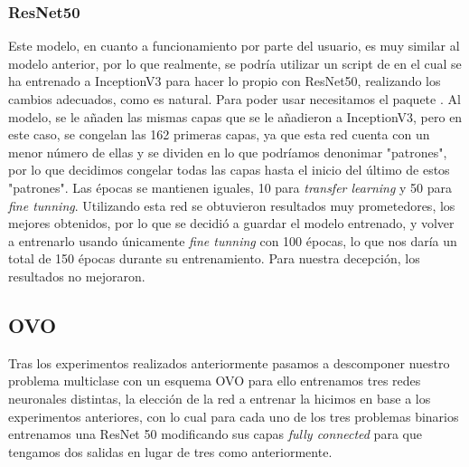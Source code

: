 \subsubsection{ResNet50}

Este modelo, en cuanto a funcionamiento por parte del usuario, es muy similar al modelo anterior, por lo que realmente, se podría utilizar un script de en el cual se ha entrenado a InceptionV3 para hacer lo propio con ResNet50, realizando los cambios adecuados, como es natural. Para poder usar  necesitamos el paquete . Al modelo, se le añaden las mismas capas que se le añadieron a InceptionV3, pero en este caso, se congelan las 162 primeras capas, ya que esta red cuenta con un menor número de ellas y se dividen en lo que podríamos denonimar "patrones", por lo que decidimos congelar todas las capas hasta el inicio del último de estos "patrones". Las épocas se mantienen iguales, 10 para \textit{transfer learning} y 50 para \textit{fine tunning}. Utilizando esta red se obtuvieron resultados muy prometedores, los mejores obtenidos, por lo que se decidió a guardar el modelo entrenado, y volver a entrenarlo usando únicamente \textit{fine tunning} con 100 épocas, lo que nos daría un total de 150 épocas durante su entrenamiento. Para nuestra decepción, los resultados no mejoraron.































 







\subsection{OVO}

Tras los experimentos realizados anteriormente pasamos a descomponer nuestro problema multiclase con un esquema OVO para ello entrenamos tres redes neuronales distintas, la elección de la red a entrenar la hicimos en base a los experimentos anteriores, con lo cual para cada uno de los tres problemas binarios entrenamos una ResNet 50 modificando sus capas \textit{fully connected} para que tengamos dos salidas en lugar de tres como anteriormente.\\


